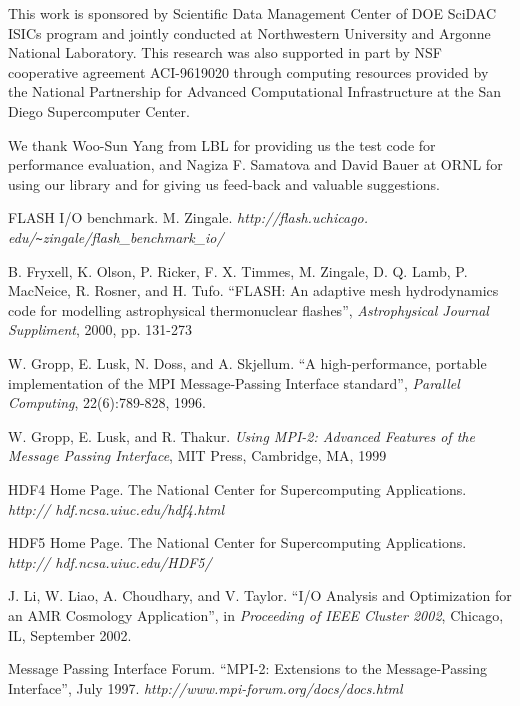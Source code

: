 \documentclass[10pt,twocolumn]{article}          %
\begin{document}
This work is sponsored by Scientific Data Management Center of DOE SciDAC ISICs program and jointly
conducted at Northwestern University and Argonne National Laboratory. This research was also
supported in part by NSF cooperative agreement ACI-9619020 through computing resources provided by
the National Partnership for Advanced Computational Infrastructure at the San Diego Supercomputer
Center.

We thank Woo-Sun Yang from LBL for providing us the test code for
performance evaluation, and Nagiza F. Samatova and David Bauer at
ORNL for using our library and for giving us feed-back and
valuable suggestions.

\begin{thebibliography}{99}

\small \setlength{\parskip}{-0.3pc}

FLASH I/O benchmark. M. Zingale. {\em http://flash.uchicago.
edu/\verb|~|zingale/flash\_benchmark\_io/}

B. Fryxell, K. Olson, P. Ricker, F. X. Timmes, M. Zingale, D. Q. Lamb, P. MacNeice, R. Rosner, and
H. Tufo. ``FLASH: An adaptive mesh hydrodynamics code for modelling astrophysical thermonuclear
flashes'', {\em Astrophysical Journal Suppliment}, 2000, pp. 131-273

W. Gropp, E. Lusk, N. Doss, and A. Skjellum. ``A high-performance, portable implementation of the
MPI Message-Passing Interface standard'', {\em Parallel Computing}, 22(6):789-828, 1996.

W. Gropp, E. Lusk, and R. Thakur. {\em Using MPI-2: Advanced Features of the Message Passing
Interface}, MIT Press, Cambridge, MA, 1999

HDF4 Home Page. The National Center for Supercomputing Applications. {\em http://
hdf.ncsa.uiuc.edu/hdf4.html}

HDF5 Home Page. The National Center for Supercomputing Applications. {\em http://
hdf.ncsa.uiuc.edu/HDF5/}

J. Li, W. Liao, A. Choudhary, and V. Taylor. ``I/O Analysis and
Optimization for an AMR Cosmology Application'', in {\em
Proceeding of IEEE Cluster 2002}, Chicago, IL, September 2002.

Message Passing Interface Forum. ``MPI-2: Extensions to the Message-Passing Interface'', July 1997.
{\em http://www.mpi-forum.org/docs/docs.html}


\end{thebibliography}
\end{document}
